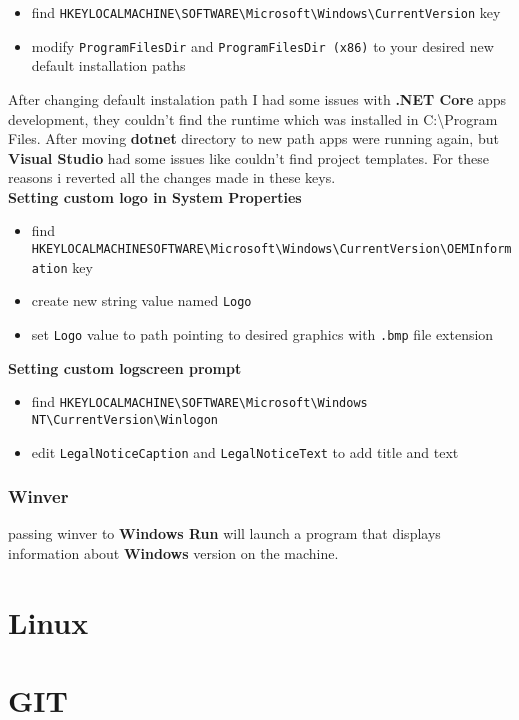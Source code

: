 \documentclass[11pt,a4paper]{article}
\def\bs{\textbackslash}
\def\us{\textunderscore}
\begin{document}
\begin{itemize}
\item find \texttt{HKEY{\us}LOCAL{\us}MACHINE{\bs}SOFTWARE{\bs}Microsoft{\bs}Windows{\bs}CurrentVersion} key
\item modify \texttt{ProgramFilesDir} and \texttt{ProgramFilesDir (x86)} to your desired new default installation paths
\end{itemize}

 After changing default instalation path I had some issues with \textbf{.NET Core} apps development, they couldn't find the runtime which was installed in C:{\bs}Program Files. After moving \textbf{dotnet} directory to new path apps were running again, but \textbf{Visual Studio} had some issues like couldn't find project templates. For these reasons i reverted all the changes made in these keys.\\

\textbf{Setting custom logo in System Properties }
\begin{itemize}
\item find \texttt{HKEY{\us}LOCAL{\us}MACHINE{\us}SOFTWARE{\bs}Microsoft{\bs}Windows{\bs}CurrentVersion{\bs}OEMInformation} key
\item create new string value named \texttt{Logo}
\item set \texttt{Logo} value to path pointing to desired graphics with \texttt{.bmp} file extension
\end{itemize}

\textbf{Setting custom logscreen prompt}
\begin{itemize}
\item find \texttt{HKEY{\us}LOCAL{\us}MACHINE{\bs}SOFTWARE{\bs}Microsoft{\bs}Windows NT{\bs}CurrentVersion{\bs}Winlogon}
\item edit \texttt{LegalNoticeCaption} and \texttt{LegalNoticeText} to add title and text
\end{itemize}

\subsubsection{Winver}
passing winver to \textbf{Windows Run} will launch a program that displays information about \textbf{Windows} version on the machine.

\section{Linux}

\section{GIT}
\end{document}

